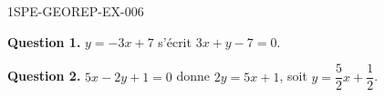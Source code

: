 \begin{corrige}{1SPE-GEOREP-EX-006}

\textbf{Question 1.} $y = -3x + 7$ s'écrit $3x + y - 7 = 0$.

\textbf{Question 2.} $5x - 2y + 1 = 0$ donne $2y = 5x + 1$, soit $y = \dfrac{5}{2}x + \dfrac{1}{2}$.

\end{corrige}
